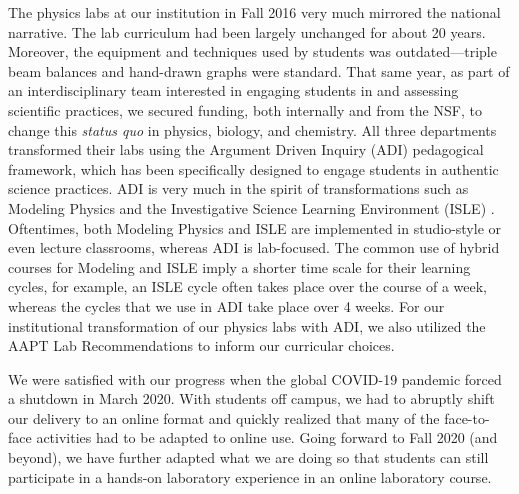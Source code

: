 \documentclass[aip, numerical, preprint]{revtex4-2}
\begin{document}

The physics labs at our institution in Fall 2016 very much mirrored the national narrative.
The lab curriculum had been largely unchanged for about 20 years. Moreover, the equipment and
techniques used by students was outdated---triple beam balances and hand-drawn graphs were
standard.  That same year, as part of an interdisciplinary team interested in engaging students
in and assessing scientific practices, we secured funding, both internally and from the NSF, to
change this \emph{status quo} in physics, biology, and chemistry.  All three departments
transformed their labs using the Argument Driven Inquiry
(ADI)\citep{Sampson2011,Walker2011,Walker2016} pedagogical framework, which has been
specifically designed to engage students in authentic science practices. ADI is very much in
the spirit of transformations such as Modeling Physics\cite{modelingBrewe2008} and the
Investigative Science Learning Environment (ISLE) \cite{etkina2007investigative}. Oftentimes,
both Modeling Physics and ISLE are implemented in studio-style or even lecture classrooms,
whereas ADI is lab-focused. The common use of hybrid courses for Modeling and ISLE imply a
shorter time scale for their learning cycles, for example, an ISLE cycle often takes place over
the course of a week, whereas the cycles that we use in ADI take place over 4 weeks. For our
institutional transformation of our physics labs with ADI, we also utilized the AAPT Lab
Recommendations to inform our curricular choices.\citep{kozminski2014aapt}

We were satisfied with our progress when the global COVID-19 pandemic forced a shutdown in
March 2020.  With students off campus, we had to abruptly shift our delivery to an online
format and quickly realized that many of the face-to-face activities had to be adapted to
online use.  Going forward to Fall 2020 (and beyond), we have further adapted what we are doing
so that students can still participate in a hands-on laboratory experience in an online
laboratory course.
\end{document}
